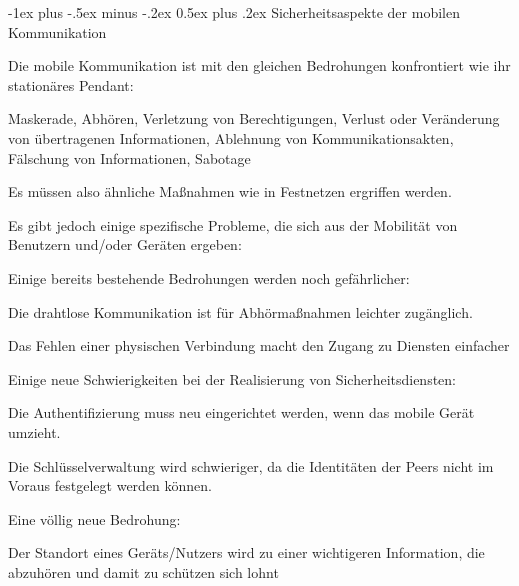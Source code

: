 \documentclass[a4paper]{article}
\makeatletter
\renewcommand{\section}{\@startsection{section}{1}{0mm}%
 {-1ex plus -.5ex minus -.2ex}%
 {0.5ex plus .2ex}%
 {\normalfont\large\bfseries}}
\makeatother
\begin{document}
\begin{multicols}{3}
      \section{Sicherheitsaspekte der mobilen Kommunikation}
      \begin{itemize*}
            \item Die mobile Kommunikation ist mit den gleichen Bedrohungen konfrontiert wie ihr stationäres Pendant:
            \begin{itemize*}
                  \item Maskerade, Abhören, Verletzung von Berechtigungen, Verlust oder Veränderung von übertragenen Informationen, Ablehnung von Kommunikationsakten, Fälschung von Informationen, Sabotage
                  \item Es müssen also ähnliche Maßnahmen wie in Festnetzen ergriffen werden.
            \end{itemize*}
            \item Es gibt jedoch einige spezifische Probleme, die sich aus der Mobilität von Benutzern und/oder Geräten ergeben:
            \begin{itemize*}
                  \item Einige bereits bestehende Bedrohungen werden noch gefährlicher:
                  \begin{itemize*}
                        \item Die drahtlose Kommunikation ist für Abhörmaßnahmen leichter zugänglich.
                        \item Das Fehlen einer physischen Verbindung macht den Zugang zu Diensten einfacher
                  \end{itemize*}
                  \item Einige neue Schwierigkeiten bei der Realisierung von Sicherheitsdiensten:
                  \begin{itemize*}
                        \item Die Authentifizierung muss neu eingerichtet werden, wenn das mobile Gerät umzieht.
                        \item Die Schlüsselverwaltung wird schwieriger, da die Identitäten der Peers nicht im Voraus festgelegt werden können.
                  \end{itemize*}
                  \item Eine völlig neue Bedrohung:
                  \begin{itemize*}
                        \item Der Standort eines Geräts/Nutzers wird zu einer wichtigeren Information, die abzuhören und damit zu schützen sich lohnt
                  \end{itemize*}
            \end{itemize*}
      \end{itemize*}


\end{multicols}
\end{document}
